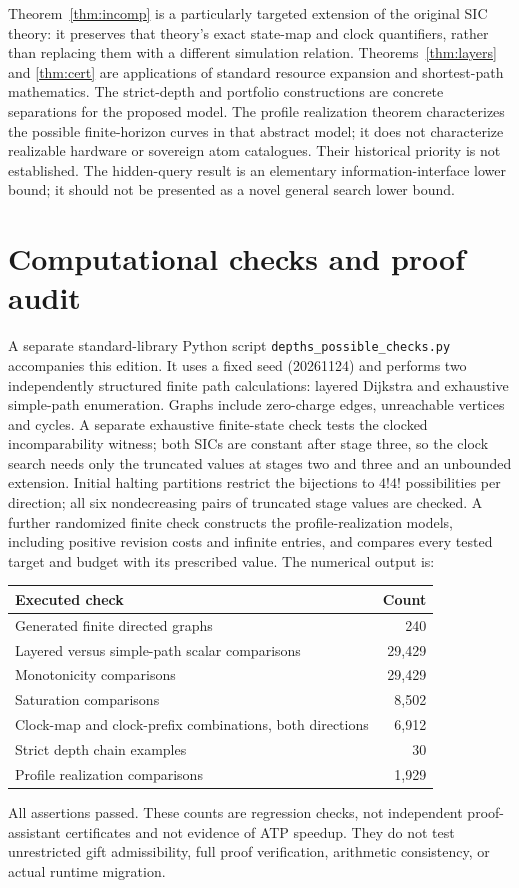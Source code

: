 \documentclass[11pt]{article}
\theoremstyle{remark}\newtheorem{remark}[theorem]{Remark}
\begin{document}
Theorem~\ref{thm:incomp} is a particularly targeted extension of the original SIC theory: it preserves that theory's exact state-map and clock quantifiers, rather than replacing them with a different simulation relation. Theorems~\ref{thm:layers} and \ref{thm:cert} are applications of standard resource expansion and shortest-path mathematics. The strict-depth and portfolio constructions are concrete separations for the proposed model. The profile realization theorem characterizes the possible finite-horizon curves in that abstract model; it does not characterize realizable hardware or sovereign atom catalogues. Their historical priority is not established. The hidden-query result is an elementary information-interface lower bound; it should not be presented as a novel general search lower bound.

\section{Computational checks and proof audit}
A separate standard-library Python script \texttt{depths\_possible\_checks.py} accompanies this edition. It uses a fixed seed (20261124) and performs two independently structured finite path calculations: layered Dijkstra and exhaustive simple-path enumeration. Graphs include zero-charge edges, unreachable vertices and cycles. A separate exhaustive finite-state check tests the clocked incomparability witness; both SICs are constant after stage three, so the clock search needs only the truncated values at stages two and three and an unbounded extension. Initial halting partitions restrict the bijections to $4!4!$ possibilities per direction; all six nondecreasing pairs of truncated stage values are checked. A further randomized finite check constructs the profile-realization models, including positive revision costs and infinite entries, and compares every tested target and budget with its prescribed value. The numerical output is:
\begin{center}
\begin{tabular}{lr}
\toprule Executed check & Count\\\midrule
Generated finite directed graphs & 240\\
Layered versus simple-path scalar comparisons & 29,429\\
Monotonicity comparisons & 29,429\\
Saturation comparisons & 8,502\\
Clock-map and clock-prefix combinations, both directions & 6,912\\
Strict depth chain examples & 30\\
Profile realization comparisons & 1,929\\\bottomrule
\end{tabular}
\end{center}
All assertions passed. These counts are regression checks, not independent proof-assistant certificates and not evidence of ATP speedup. They do not test unrestricted gift admissibility, full proof verification, arithmetic consistency, or actual runtime migration.
\end{document}
